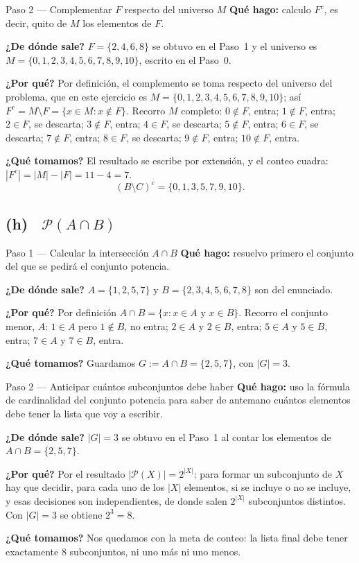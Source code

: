 \documentclass[11pt]{article}
\begin{document}
\begin{paso}{Paso 2 --- Complementar $F$ respecto del universo $M$}
\textbf{Qué hago:} calculo $F^{c}$, es decir, quito de $M$ los elementos de $F$.

\textbf{¿De dónde sale?} $F=\{2,4,6,8\}$ se obtuvo en el Paso~1 y el universo es
$M=\{0,1,2,3,4,5,6,7,8,9,10\}$, escrito en el Paso~0.

\textbf{¿Por qué?} Por definición, el complemento se toma respecto del universo del problema,
que en este ejercicio es $M=\{0,1,2,3,4,5,6,7,8,9,10\}$; así $F^{c}=M\setminus F=\{x\in M:
x\notin F\}$. Recorro $M$ completo: $0\notin F$, entra; $1\notin F$, entra; $2\in F$, se
descarta; $3\notin F$, entra; $4\in F$, se descarta; $5\notin F$, entra; $6\in F$, se
descarta; $7\notin F$, entra; $8\in F$, se descarta; $9\notin F$, entra; $10\notin F$, entra.

\textbf{¿Qué tomamos?} El resultado se escribe por extensión, y el conteo cuadra:
$|F^{c}|=|M|-|F|=11-4=7$.
\[
(B\setminus C)^{c}=\{0,1,3,5,7,9,10\}.
\]
\end{paso}

\subsection*{(h) \ $\mathcal{P}(A\cap B)$}

\begin{paso}{Paso 1 --- Calcular la intersección $A\cap B$}
\textbf{Qué hago:} resuelvo primero el conjunto del que se pedirá el conjunto potencia.

\textbf{¿De dónde sale?} $A=\{1,2,5,7\}$ y $B=\{2,3,4,5,6,7,8\}$ son del enunciado.

\textbf{¿Por qué?} Por definición $A\cap B=\{x: x\in A \text{ y } x\in B\}$. Recorro el
conjunto menor, $A$: $1\in A$ pero $1\notin B$, no entra; $2\in A$ y $2\in B$, entra;
$5\in A$ y $5\in B$, entra; $7\in A$ y $7\in B$, entra.

\textbf{¿Qué tomamos?} Guardamos $G:=A\cap B=\{2,5,7\}$, con $|G|=3$.
\end{paso}

\begin{paso}{Paso 2 --- Anticipar cuántos subconjuntos debe haber}
\textbf{Qué hago:} uso la fórmula de cardinalidad del conjunto potencia para saber de
antemano cuántos elementos debe tener la lista que voy a escribir.

\textbf{¿De dónde sale?} $|G|=3$ se obtuvo en el Paso~1 al contar los elementos de
$A\cap B=\{2,5,7\}$.

\textbf{¿Por qué?} Por el resultado $|\mathcal{P}(X)|=2^{|X|}$: para formar un subconjunto de
$X$ hay que decidir, para cada uno de los $|X|$ elementos, si se incluye o no se incluye, y
esas decisiones son independientes, de donde salen $2^{|X|}$ subconjuntos distintos. Con
$|G|=3$ se obtiene $2^{3}=8$.

\textbf{¿Qué tomamos?} Nos quedamos con la meta de conteo: la lista final debe tener
exactamente $8$ subconjuntos, ni uno más ni uno menos.
\end{paso}
\end{document}
